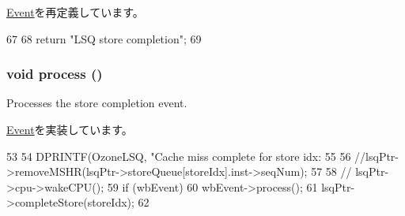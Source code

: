 \hyperlink{classEvent_a130ddddf003422b413e2e891b1b80e8f}{Event}を再定義しています。


\begin{DoxyCode}
67 {
68     return "LSQ store completion";
69 }
\end{DoxyCode}
\hypertarget{classOzoneLSQ_1_1StoreCompletionEvent_a2e9c5136d19b1a95fc427e0852deab5c}{
\subsubsection[{process}]{\setlength{\rightskip}{0pt plus 5cm}void process ()}}
\label{classOzoneLSQ_1_1StoreCompletionEvent_a2e9c5136d19b1a95fc427e0852deab5c}
Processes the store completion event. 

\hyperlink{classEvent_a142b75b68a6291400e20fb0dd905b1c8}{Event}を実装しています。


\begin{DoxyCode}
53 {
54     DPRINTF(OzoneLSQ, "Cache miss complete for store idx:%
55 
56     //lsqPtr->removeMSHR(lsqPtr->storeQueue[storeIdx].inst->seqNum);
57 
58 //    lsqPtr->cpu->wakeCPU();
59     if (wbEvent)
60         wbEvent->process();
61     lsqPtr->completeStore(storeIdx);
62 }
\end{DoxyCode}


